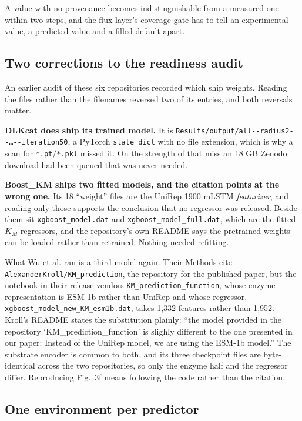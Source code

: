 A value with no provenance
becomes indistinguishable from a measured one within two steps, and the flux layer's
coverage gate has to tell an experimental value, a predicted value and a filled default
apart.

\subsection{Two corrections to the readiness audit}

An earlier audit of these six repositories recorded which ship weights. Reading the files
rather than the filenames reversed two of its entries, and both reversals matter.

\textbf{DLKcat does ship its trained model.} It is
\texttt{Results/output/all-\/-radius2-\/-\ldots-\/-iteration50}, a PyTorch
\texttt{state\_dict} with no file extension, which is why a scan for
\texttt{*.pt}/\texttt{*.pkl} missed it. On the strength of that miss an 18 GB Zenodo
download had been queued that was never needed.

\textbf{Boost\_KM ships two fitted models, and the citation points at the wrong one.} Its
18 ``weight'' files are the UniRep 1900 mLSTM \emph{featurizer}, and reading only those
supports the conclusion that no regressor was released. Beside them sit
\texttt{xgboost\_model.dat} and \texttt{xgboost\_model\_full.dat}, which are the fitted
$K_M$ regressors, and the repository's own README says the pretrained weights can be
loaded rather than retrained. Nothing needed refitting.

What Wu et al. ran is a third model again. Their Methods cite
\texttt{AlexanderKroll/KM\_prediction}, the repository for the published paper, but the
notebook in their release vendors \texttt{KM\_prediction\_function}, whose enzyme
representation is ESM-1b rather than UniRep and whose regressor,
\texttt{xgboost\_model\_new\_KM\_esm1b.dat}, takes 1{,}332 features rather than 1{,}952.
Kroll's README states the substitution plainly: ``the model provided in the repository
`KM\_prediction\_function' is slighly different to the one presented in our paper: Instead
of the UniRep model, we are using the ESM-1b model.'' The substrate encoder is common to
both, and its three checkpoint files are byte-identical across the two repositories, so
only the enzyme half and the regressor differ. Reproducing Fig.~3f means following the
code rather than the citation.

\subsection{One environment per predictor}

